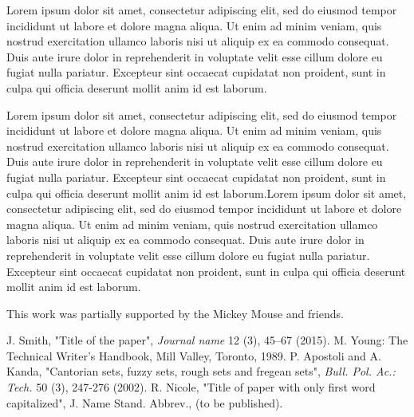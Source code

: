 \documentclass[10pt,twoside,twocolumn,a4paper]{article}
\begin{document}
Lorem ipsum dolor sit amet, consectetur adipiscing elit, sed do eiusmod tempor incididunt ut labore et dolore magna aliqua. Ut enim ad minim veniam, quis nostrud exercitation ullamco laboris nisi ut aliquip ex ea commodo consequat. Duis aute irure dolor in reprehenderit in voluptate velit esse cillum dolore eu fugiat nulla pariatur. Excepteur sint occaecat cupidatat non proident, sunt in culpa qui officia deserunt mollit anim id est laborum.

Lorem ipsum dolor sit amet, consectetur adipiscing elit, sed do eiusmod tempor incididunt ut labore et dolore magna aliqua. Ut enim ad minim veniam, quis nostrud exercitation ullamco laboris nisi ut aliquip ex ea commodo consequat. Duis aute irure dolor in reprehenderit in voluptate velit esse cillum dolore eu fugiat nulla pariatur. Excepteur sint occaecat cupidatat non proident, sunt in culpa qui officia deserunt mollit anim id est laborum.Lorem ipsum dolor sit amet, consectetur adipiscing elit, sed do eiusmod tempor incididunt ut labore et dolore magna aliqua. Ut enim ad minim veniam, quis nostrud exercitation ullamco laboris nisi ut aliquip ex ea commodo consequat. Duis aute irure dolor in reprehenderit in voluptate velit esse cillum dolore eu fugiat nulla pariatur. Excepteur sint occaecat cupidatat non proident, sunt in culpa qui officia deserunt mollit anim id est laborum.


\begin{acknowledgements}
This work was partially supported by the Mickey Mouse and friends.
\end{acknowledgements}


\begin{thebibliography}{99}
 J. Smith, "Title of the paper", \emph{Journal name} 12 (3), 45--67 (2015).
 M. Young: The Technical Writer’s Handbook, Mill Valley, Toronto, 1989.
 P. Apostoli and A. Kanda, "Cantorian sets, fuzzy sets, rough sets and fregean sets", \emph{Bull. Pol. Ac.: Tech.} 50 (3), 247-276 (2002).
 R. Nicole, "Title of paper with only first word capitalized", J. Name Stand. Abbrev., (to be published).
\end{thebibliography}
\end{document}
